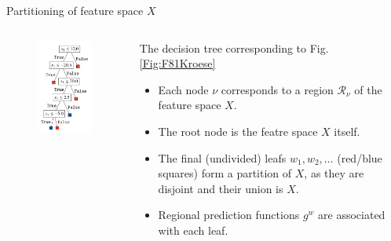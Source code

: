 \documentclass{beamer}
\begin{document}
\begin{frame}{Partitioning of feature space $X$}
    \begin{columns}
        \begin{column}{0.4\linewidth}
            \begin{figure}
                \includegraphics[width=0.7\linewidth]{F82Kroese}
                \label{Fig:F82Kroese}
            \end{figure}
        \end{column}
        \begin{column}{0.6\linewidth}
            The decision tree corresponding to Fig. \ref{Fig:F81Kroese}\cite{kroese2020}
            \begin{itemize}
                \item Each node $\nu$ corresponds to a region $\mathcal{R}_{\nu}$ of the feature space $X$. 
                \item The root node is the featre space $X$ itself.
                \item The final (undivided) leafs $w_1, w_2, \ldots$ (red/blue squares) form a partition of $X$, as they are disjoint and their union is $X$.
                \item Regional prediction functions $g^w$ are associated with each leaf.
            \end{itemize}
        \end{column}
    \end{columns}
\end{frame}
\end{document}

